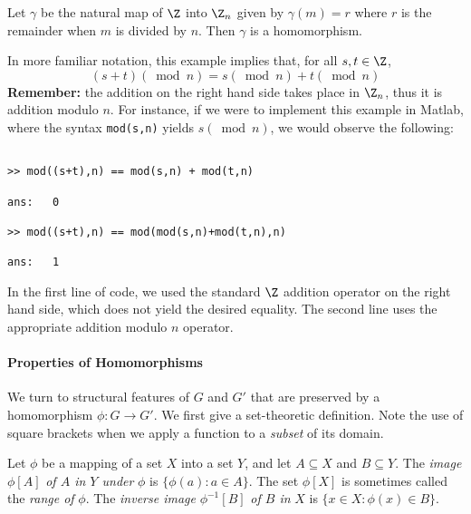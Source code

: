 \begin{example}\label{ex:modn}
Let $\gamma$ be the natural map of $\Z$ into $\Z_n$ given by
$\gamma(m) = r$ where $r$ is the remainder when $m$ is divided by
$n$.  Then $\gamma$ is a homomorphism.
\end{example}
In more familiar notation, this example implies that, for all $s,t\in
\Z$,
\[ 
(s+t)(\bmod n) = s(\bmod n) + t(\bmod n)
\]
{\bf Remember:} the addition on the right hand side takes place in
$\Z_n$, thus it is addition modulo $n$.  For instance, if we were to
implement this example in Matlab, where the syntax {\tt mod(s,n)}
yields $s(\bmod n)$, we would observe the following:
\begin{verbatim}

>> mod((s+t),n) == mod(s,n) + mod(t,n)

ans:   0

>> mod((s+t),n) == mod(mod(s,n)+mod(t,n),n)

ans:   1
\end{verbatim}
In the first line of code, we used the standard $\Z$ addition
operator on the right hand side, which does not yield the desired
equality.  The second line uses the appropriate addition  modulo $n$
operator.
\paragraph{Properties of Homomorphisms}
We turn to structural features of $G$ and $G'$ that are preserved by a
homomorphism $\phi:G\to G'$.  We first give a set-theoretic
definition.  Note the use of square brackets when we apply a function
to a \emph{subset} of its domain.

\begin{definition}
Let $\phi$ be a mapping of a set $X$ into a set $Y$, and let $A\subseteq
X$ and $B\subseteq Y$. The \emph{image} $\phi[A]$ \emph{of $A$ in $Y$
under} $\phi$ is $\{\phi(a):a\in A\}$.  The set $\phi[X]$ is sometimes
called the \emph{range of} $\phi$.  The \emph{inverse image}
$\phi^{-1}[B]$ \emph{of $B$ in} $X$ is $\{x\in X: \phi(x) \in B\}$.
\end{definition}

